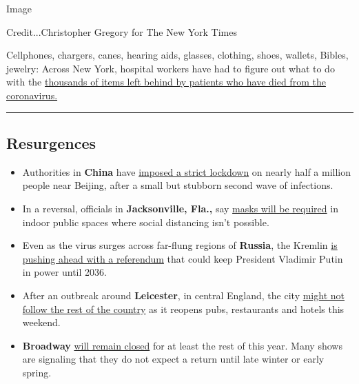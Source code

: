 Image

Credit...Christopher Gregory for The New York Times

Cellphones, chargers, canes, hearing aids, glasses, clothing, shoes,
wallets, Bibles, jewelry: Across New York, hospital workers have had to
figure out what to do with the
\href{https://www.nytimes.com/2020/06/29/nyregion/coronavirus-hospitals-patients-belongings.html}{thousands
of items left behind by patients who have died from the coronavirus.}

\begin{center}\rule{0.5\linewidth}{\linethickness}\end{center}

\hypertarget{resurgences}{%
\subsection{Resurgences}\label{resurgences}}

\begin{itemize}
\item
  Authorities in \textbf{China} have
  \href{https://www.nytimes.com/2020/06/29/world/coronavirus-updates.html\#link-4f49ac1}{imposed
  a strict lockdown} on nearly half a million people near Beijing, after
  a small but stubborn second wave of infections.
\item
  In a reversal, officials in \textbf{Jacksonville, Fla.,} say
  \href{https://www.nytimes.com/2020/06/29/world/coronavirus-live-updates.html\#link-102ec095}{masks
  will be required} in indoor public spaces where social distancing
  isn't possible.
\item
  Even as the virus surges across far-flung regions of \textbf{Russia},
  the Kremlin
  \href{https://www.nytimes.com/2020/06/29/world/europe/coronavirus-russia-putin-referendum.html}{is
  pushing ahead with a referendum} that could keep President Vladimir
  Putin in power until 2036.
\item
  After an outbreak around \textbf{Leicester}, in central England, the
  city
  \href{https://www.nytimes.com/2020/06/29/world/coronavirus-updates.html\#link-4f49ac1}{might
  not follow the rest of the country} as it reopens pubs, restaurants
  and hotels this weekend.
\item
  \textbf{Broadway}
  \href{https://www.nytimes.com/2020/06/29/world/coronavirus-live-updates.html\#link-27ecd755}{will
  remain closed} for at least the rest of this year. Many shows are
  signaling that they do not expect a return until late winter or early
  spring.
\end{itemize}

